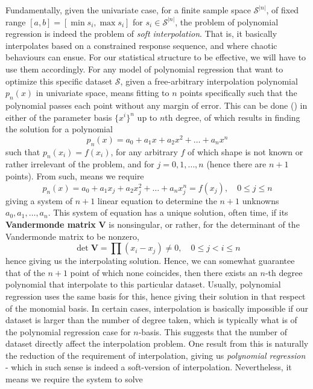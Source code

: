 \documentclass[10pt]{article}
\begin{document}
Fundamentally, given the univariate case, for a finite sample space $\mathcal{S}^{\lvert n\rvert}$, of fixed range $[a,b]=[\min s_{i},\max s_{i}]$ for $s_{i}\in \mathcal{S}^{\lvert n\rvert}$, the problem of polynomial regression is indeed the problem of \textit{soft interpolation}. That is, it basically interpolates based on a constrained response sequence, and where chaotic behaviours can ensue. For our statistical structure to be effective, we will have to use them accordingly. For any model of polynomial regression that want to optimize this specific dataset $\mathcal{S}$, given a free-arbitrary interpolation polynomial $p_{n}(x)$ in univariate space, means fitting to $n$ points specifically such that the polynomial passes each point without any margin of error. This can be done (\cite{McArtneyInterpolation2003}) in either of the parameter basis $\{x^{i}\}^{n}$ up to $n$th degree, of which results in finding the solution for a polynomial 
\begin{equation}
    p_{n}(x) = a_{0} + a_{1} x + a_{2} x^{2} + \dots + a_{n}x^{n} 
\end{equation}
such that $p_{n}(x_{i})=f(x_{i})$, for any arbitrary $f$ of which shape is not known or rather irrelevant of the problem, and for $j=0,1,\dots,n$ (hence there are $n+1$ points). From such, means we require 
\begin{equation}
    p_{n}(x) = a_{0} + a_{1} x_{j} + a_{2} x^{2}_{j} + \dots + a_{n}x^{n}_{j} = f(x_{j}), \quad 0 \leq j \leq n 
\end{equation}
giving a system of $n+1$ linear equation to determine the $n+1$ unknowns $a_{0},a_{1},\dots,a_{n}$. This system of equation has a unique solution, often time, if its \textbf{Vandermonde matrix} $\mathbf{V}$ is nonsingular, or rather, for the determinant of the Vandermonde matrix to be nonzero, \begin{equation}
    \det{\mathbf{V}} = \prod (x_{i}-x_{j}) \ne 0 , \quad 0 \leq j < i \leq n 
\end{equation}
hence giving us the interpolating solution. Hence, we can somewhat guarantee that of the $n+1$ point of which none coincides, then there exists an $n$-th degree polynomial that interpolate to this particular dataset. Usually, polynomial regression uses the same basis for this, hence giving their solution in that respect of the monomial basis. In certain cases, interpolation is basically impossible if our dataset is larger than the number of degree taken, which is typically what is of the polynomial regression case for $n$-basis. This suggests that the number of dataset directly affect the interpolation problem. One result from this is naturally the reduction of the requirement of interpolation, giving us \textit{polynomial regression} - which in such sense is indeed a soft-version of interpolation. Nevertheless, it means we require the system to solve 
\end{document}
